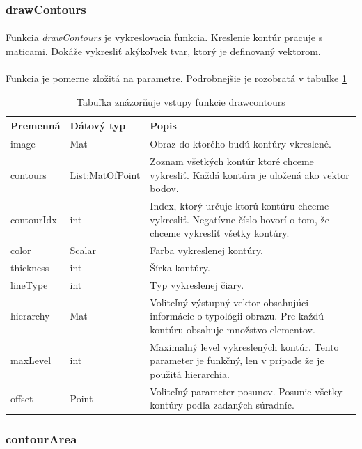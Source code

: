 \documentclass[12pt]{article}
\begin{document}
\subsubsection{drawContours}
\paragraph{}
Funkcia \emph{drawContours} je vykreslovacia funkcia. Kreslenie kontúr pracuje s maticami. Dokáže vykresliť akýkoľvek tvar, ktorý je definovaný vektorom.
\cite{OpenCVDoc}
\paragraph{}
Funkcia je pomerne zložitá na parametre. Podrobnejšie je rozobratá v tabuľke \ref{drawcontoursPar}
\begin{table}
	\centering
    \begin{tabular}{ | l | l | p{5cm} |}
    \hline
    Premenná & Dátový typ & Popis \\ \hline
    image & Mat & Obraz do ktorého budú kontúry vkreslené. \\ \hline
    contours & List:MatOfPoint & Zoznam všetkých kontúr ktoré chceme vykresliť. Každá kontúra je uložená ako vektor bodov. \\ \hline
    contourIdx & int & Index, ktorý určuje ktorú kontúru chceme vykresliť. Negatívne číslo hovorí o tom, že chceme vykresliť všetky kontúry. \\ \hline
    color & Scalar & Farba vykreslenej kontúry. \\ \hline
    thickness & int & Šírka kontúry. \\ \hline
    lineType & int & Typ vykreslenej čiary. \\ \hline
    hierarchy & Mat & Voliteľný výstupný vektor obsahujúci informácie o typológii obrazu. Pre každú kontúru obsahuje množstvo elementov. \\ \hline
    maxLevel & int & Maximalný level vykreslených kontúr. Tento parameter je funkčný, len v prípade že je použitá hierarchia. \\ \hline
    offset & Point & Voliteľný parameter posunov. Posunie všetky kontúry podľa zadaných súradníc. \\
    \hline
    \end{tabular}
  	\caption{Tabuľka znázorňuje vstupy funkcie drawcontours}
  	\label{drawcontoursPar}
\end{table}
\subsubsection{contourArea}
\end{document}
